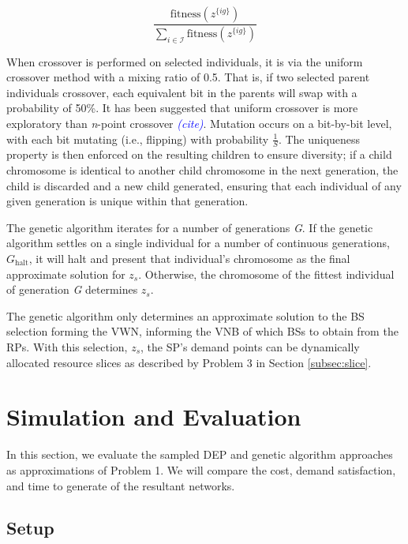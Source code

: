 \documentclass[conference]{IEEEtran}
\begin{document}

\[
\frac{\text{fitness}\left( z^{\{ig\}} \right)}{\sum_{i \in \mathcal{I}} \text{fitness}\left( z^{\{ig\}} \right)}
\]

When crossover is performed on selected individuals, it is via the uniform crossover method with a mixing ratio of 0.5.  That is, if two selected parent individuals crossover, each equivalent bit in the parents will swap with a probability of 50\%.  It has been suggested that uniform crossover is more exploratory than \textit{n}-point crossover \textcolor{blue}{\textit{(cite)}}.  Mutation occurs on a bit-by-bit level, with each bit mutating (i.e., flipping) with probability $\frac{1}{S}$.  The uniqueness property is then enforced on the resulting children to ensure diversity; if a child chromosome is identical to another child chromosome in the next generation, the child is discarded and a new child generated, ensuring that each individual of any given generation is unique within that generation.

The genetic algorithm iterates for a number of generations \textit{G}.  If the genetic algorithm settles on a single individual for a number of continuous generations, $G_\text{halt}$, it will halt and present that individual's chromosome as the final approximate solution for $z_s$.  Otherwise, the chromosome of the fittest individual of generation \textit{G} determines $z_s$.

The genetic algorithm only determines an approximate solution to the BS selection forming the VWN, informing the VNB of which BSs to obtain from the RPs.  With this selection, $z_s$, the SP's demand points can be dynamically allocated resource slices as described by Problem 3 in Section \ref{subsec:slice}.

\section{Simulation and Evaluation} \label{sec:sim}
In this section, we evaluate the sampled DEP and genetic algorithm approaches as approximations of Problem 1.  We will compare the cost, demand satisfaction, and time to generate of the resultant networks.

\subsection{Setup} \label{subsec:setup}
\end{document}
